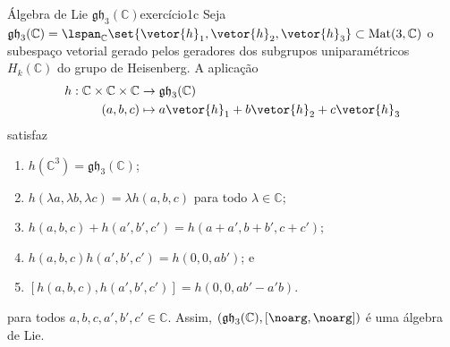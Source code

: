 \begin{proposition}{Álgebra de Lie \(\mathfrak{gh}_3(\mathbb{C})\)}{exercício1c}
    Seja \(\mathfrak{gh}_3(\mathbb{C}) = \lspan_{\mathbb{C}}\set{\vetor{h}_1,\vetor{h}_2, \vetor{h}_3} \subset \mathrm{Mat}(3,\mathbb{C})\) o subespaço vetorial gerado pelos geradores dos subgrupos uniparamétricos \(H_k(\mathbb{C})\) do grupo de Heisenberg. A aplicação
    \begin{align*}
        h : \mathbb{C} \times \mathbb{C} \times \mathbb{C} &\to \mathfrak{gh}_3(\mathbb{C})\\
                                                   (a,b,c) &\mapsto a\vetor{h}_1 + b\vetor{h}_2 + c\vetor{h}_3
    \end{align*}
    satisfaz
    \begin{enumerate}[label=(\roman*)]
        \item \(h(\mathbb{C}^3) = \mathfrak{gh}_3(\mathbb{C})\);
        \item \(h(\lambda a, \lambda b, \lambda c) = \lambda h(a,b,c)\) para todo \(\lambda \in \mathbb{C}\);
        \item \(h(a,b,c) + h(a',b',c') = h(a+a', b+b', c+c')\);
        \item \(h(a,b,c) h(a', b', c') = h(0,0,ab')\); e
        \item \([h(a,b,c), h(a',b',c')] = h(0,0,ab' - a'b)\).
    \end{enumerate}
    para todos \(a,b,c,a',b',c' \in \mathbb{C}\). Assim, \(\left(\mathfrak{gh}_3(\mathbb{C}), [\noarg,\noarg]\right)\) é uma álgebra de Lie.
\end{proposition}
